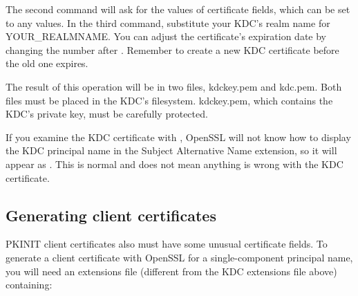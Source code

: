 \documentclass[letterpaper,10pt,english]{sphinxmanual}
\begin{document}
%
\begin{sphinxVerbatim}[commandchars=\\\{\}]
    
      
       \PYGZbs{}
            \PYGZbs{}
        
 
\end{sphinxVerbatim}

The second command will ask for the values of certificate fields,
which can be set to any values.  In the third command, substitute your
KDC’s realm name for YOUR\_REALMNAME.  You can adjust the certificate’s
expiration date by changing the number after .  Remember to
create a new KDC certificate before the old one expires.

The result of this operation will be in two files, kdckey.pem and
kdc.pem.  Both files must be placed in the KDC’s filesystem.
kdckey.pem, which contains the KDC’s private key, must be carefully
protected.

If you examine the KDC certificate with , OpenSSL will not know how to display the KDC principal
name in the Subject Alternative Name extension, so it will appear as
.  This is normal and does not mean
anything is wrong with the KDC certificate.


\subsection{Generating client certificates}
\label{\detokenize{admin/pkinit:generating-client-certificates}}
PKINIT client certificates also must have some unusual certificate
fields.  To generate a client certificate with OpenSSL for a
single-component principal name, you will need an extensions file
(different from the KDC extensions file above) containing:
\end{document}
